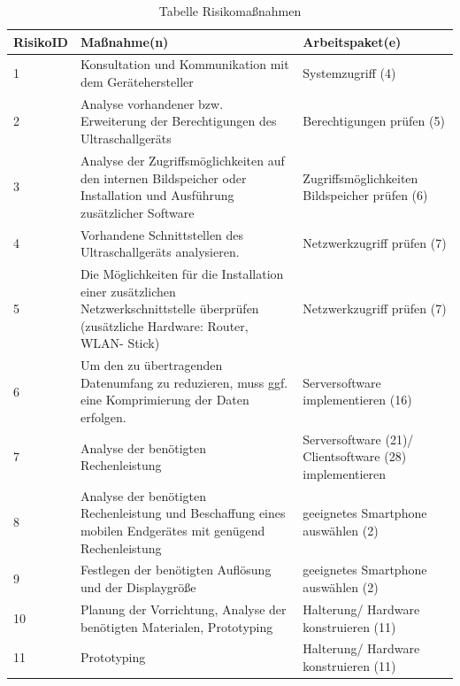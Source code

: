 \begin{center}
\begin{minipage}{1\textwidth}
\begin{table} [H]
\small
    \begin{tabular}{ | p{} | p{} | p{} | } 
    \hline
   \textbf{RisikoID} &  \textbf{Maßnahme(n)} & \textbf{Arbeitspaket(e)} \\
      \hline
1	&Konsultation und Kommunikation mit dem Gerätehersteller	& Systemzugriff (4) \\
\hline
2	&Analyse vorhandener bzw. Erweiterung der Berechtigungen des Ultraschallgeräts	& Berechtigungen prüfen (5)	\\
\hline
3	&Analyse der Zugriffsmöglichkeiten auf den internen Bildspeicher oder Installation und Ausführung zusätzlicher Software	& Zugriffsmöglichkeiten Bildspeicher prüfen (6)	\\
\hline
4	&Vorhandene Schnittstellen des Ultraschallgeräts analysieren. 	& Netzwerkzugriff prüfen (7)	\\
\hline
5	&Die Möglichkeiten für die  Installation einer zusätzlichen Netzwerkschnittstelle überprüfen (zusätzliche Hardware: Router, WLAN- Stick)	& Netzwerkzugriff prüfen (7)	\\
\hline
6	&Um den zu übertragenden  Datenumfang zu reduzieren, muss ggf. eine Komprimierung der Daten erfolgen.	& Serversoftware implementieren (16)
	\\
\hline
7	&Analyse der benötigten Rechenleistung 	& Serversoftware (21)/ Clientsoftware (28) implementieren	\\
\hline
8	&Analyse der benötigten Rechenleistung und Beschaffung eines mobilen Endgerätes mit genügend Rechenleistung	& geeignetes Smartphone auswählen (2)	\\
\hline
9	&Festlegen der benötigten Auflösung und der Displaygröße	& geeignetes Smartphone auswählen (2)	\\
\hline
10	&Planung der Vorrichtung,
Analyse der benötigten Materialen, Prototyping	& Halterung/ Hardware konstruieren (11)	\\
\hline
11	&Prototyping	& Halterung/ Hardware konstruieren (11)	\\
\hline
     \end{tabular}
     \caption{{\small Tabelle Risikomaßnahmen}}
     \label{tab:Risikomassnahmen}
     \end{table}
     \end{minipage}
\end{center}

